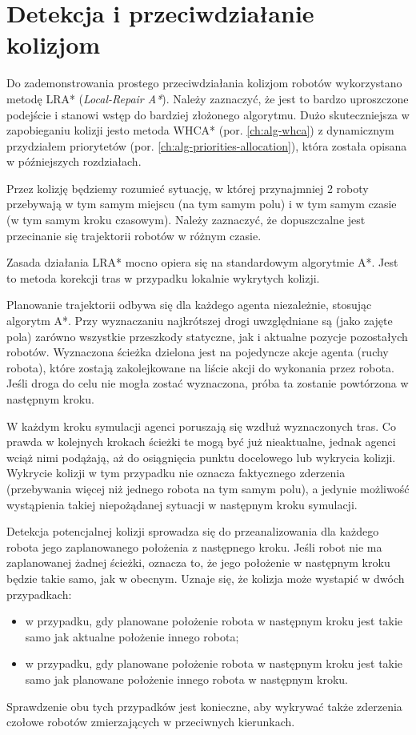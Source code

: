 \section{Detekcja i przeciwdziałanie kolizjom}
\label{ch:alg-collision-avoid}

Do zademonstrowania prostego przeciwdziałania kolizjom robotów wykorzystano metodę LRA* ({\it Local-Repair A*}).
Należy zaznaczyć, że jest to bardzo uproszczone podejście i stanowi wstęp do bardziej złożonego algorytmu.
Dużo skuteczniejsza w zapobieganiu kolizji jesto metoda WHCA* (por. \ref{ch:alg-whca}) z dynamicznym przydziałem priorytetów (por. \ref{ch:alg-priorities-allocation}), która została opisana w późniejszych rozdziałach.

Przez kolizję będziemy rozumieć sytuację, w której przynajmniej 2 roboty przebywają w tym samym miejscu (na tym samym polu) i w tym samym czasie (w tym samym kroku czasowym). Należy zaznaczyć, że dopuszczalne jest przecinanie się trajektorii robotów w różnym czasie.

Zasada działania LRA* mocno opiera się na standardowym algorytmie A*. Jest to metoda korekcji tras w przypadku lokalnie wykrytych kolizji.

Planowanie trajektorii odbywa się dla każdego agenta niezależnie, stosując algorytm A*. Przy wyznaczaniu najkrótszej drogi uwzględniane są (jako zajęte pola) zarówno wszystkie przeszkody statyczne, jak i aktualne pozycje pozostałych robotów. Wyznaczona ścieżka dzielona jest na pojedyncze akcje agenta (ruchy robota), które zostają zakolejkowane na liście akcji do wykonania przez robota. Jeśli droga do celu nie mogła zostać wyznaczona, próba ta zostanie powtórzona w następnym kroku.

W każdym kroku symulacji agenci poruszają się wzdłuż wyznaczonych tras. Co prawda w kolejnych krokach ścieżki te mogą być już nieaktualne, jednak agenci wciąż nimi podążają, aż do osiągnięcia punktu docelowego lub wykrycia kolizji.
Wykrycie kolizji w tym przypadku nie oznacza faktycznego zderzenia (przebywania więcej niż jednego robota na tym samym polu), a jedynie możliwość wystąpienia takiej niepożądanej sytuacji w następnym kroku symulacji.

Detekcja potencjalnej kolizji sprowadza się do przeanalizowania dla każdego robota jego zaplanowanego położenia z następnego kroku. Jeśli robot nie ma zaplanowanej żadnej ścieżki, oznacza to, że jego położenie w następnym kroku będzie takie samo, jak w obecnym. Uznaje się, że kolizja może wystapić w dwóch przypadkach:
\begin{itemize}
	\item w przypadku, gdy planowane położenie robota w następnym kroku jest takie samo jak aktualne położenie innego robota;
	\item w przypadku, gdy planowane położenie robota w następnym kroku jest takie samo jak planowane położenie innego robota w następnym kroku.
\end{itemize}
Sprawdzenie obu tych przypadków jest konieczne, aby wykrywać także zderzenia czołowe robotów zmierzających w przeciwnych kierunkach.

